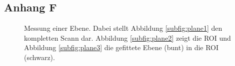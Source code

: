 \documentclass[	12pt,
				a4paper,
				bibliography=totoc,
				listof=totoc,
				index=totoc,
				twoside,
				headsepline,
				footsepline,
				ngerman]{scrartcl}
\begin{document}
\begin{appendix}
		\subsection{Anhang F}\label{anhang-f}
	
		\begin{figure}[h]
			\centering
			\caption[Messung einer Ebene]{Messung einer Ebene. Dabei stellt Abbildung \ref{subfig:plane1} den kompletten Scann dar. Abbildung \ref{subfig:plane2} zeigt die ROI und Abbildung \ref{subfig:plane3} die gefittete Ebene (bunt) in die ROI (schwarz).}
			\label{fig:plane_fit}
		\end{figure}
		

\end{appendix}
\end{document}
